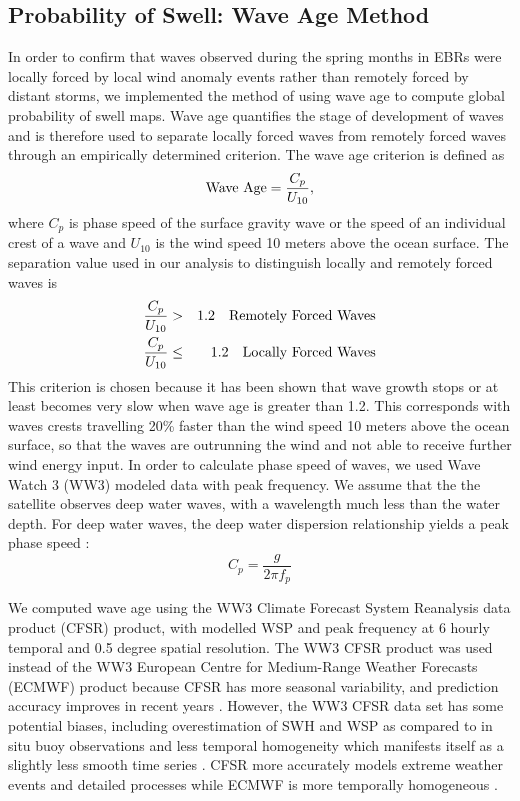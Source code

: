 \documentclass[draft,linenumbers]{agujournal2018}
\begin{document}
\subsection{Probability of Swell: Wave Age Method}

In order to confirm that waves observed during the spring months in EBRs were locally forced by local wind anomaly events rather than remotely forced by distant storms, we implemented the \citet{semedo2011global} method of using wave age to compute global probability of swell maps. Wave age quantifies the stage of development of waves and is therefore used to separate locally forced waves from remotely forced waves through an empirically determined criterion. The wave age criterion is defined as 
\begin{equation}
     \mbox{\rm Wave Age} = \frac{C_{p}}{U_{10}},
 \end{equation}
where $C_{p}$ is phase speed of the surface gravity wave or the speed of an individual crest of a wave and $U_{10}$ is the wind speed 10 meters above the ocean surface. The separation value used in our analysis to distinguish locally and remotely forced waves is 
\begin{eqnarray}
     \frac{C_{p}}{U_{10}} & > & 1.2\quad {\mbox{\rm Remotely Forced Waves}} \\
     \frac{C_{p}}{U_{10}} & \leq & 1.2\quad {\mbox{\rm Locally Forced Waves}}
\end{eqnarray}
This criterion is chosen because it has been shown that wave growth stops or at least becomes very slow when wave age is greater than 1.2. This corresponds with waves crests travelling 20\% faster than the wind speed 10 meters above the ocean surface, so that the waves are outrunning the wind and not able to receive further wind energy input.  In order to calculate phase speed of waves, we used Wave Watch 3 (WW3) modeled data with peak frequency. We assume that the the satellite observes deep water waves, with a wavelength much less than the water depth.  For deep water waves, the deep water dispersion relationship yields a peak phase speed : 
\begin{equation}
    C_{p} = \frac{g}{2\pi f_{p}}
\end{equation}

We computed wave age using the WW3 Climate Forecast System Reanalysis data product (CFSR) product, with modelled WSP and peak frequency at 6 hourly temporal and 0.5 degree spatial resolution. The WW3 CFSR product was used instead of the WW3 European Centre for Medium-Range Weather Forecasts (ECMWF) product because CFSR has more seasonal variability, and prediction accuracy improves in recent years \cite{stopa2014intercomparison}. However, the WW3 CFSR data set has some potential biases, including overestimation of SWH and WSP as compared to in situ buoy observations and less temporal homogeneity which manifests itself as a slightly less smooth time series \cite{stopa2014intercomparison}. CFSR more accurately models extreme weather events and detailed processes while ECMWF is more temporally homogeneous \cite{stopa2014intercomparison}. 
\end{document}
